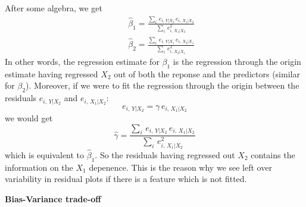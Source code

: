 \documentclass[aps,prl,preprint,superscriptaddress]{revtex4-1}
\begin{document}
After some algebra, we get
%
\begin{eqnarray}
&& {\hat \beta}_1 = \frac{ \sum_i\, e_{i, \, Y \vert X_{2}}\, e_{i, \, X_{1} \vert X_{2}}  } 
			 { \sum_i\, e_{i, \, X_{1} \vert X_{2}}^2 } \nonumber\\
%
&& {\hat \beta}_2 = \frac{ \sum_i\, e_{i, \, Y \vert X_{1}}\, e_{i, \, X_{2} \vert X_{1}}  } 
			 { \sum_i\, e_{i, \, X_{2} \vert X_{1}}^2 } 
\end{eqnarray}
%
In other words, the regression estimate for $\beta_1$ is the regression through the origin estimate having regressed
$X_2$ out of both the reponse and the predictors (similar for $\beta_2$).  
Moreover, if we were to fit the regression through the origin between the residuals $e_{i, \, Y \vert X_2}$
and $e_{i, \, X_1 \vert X_2}$:
%
\begin{equation}
e_{i, \, Y \vert X_2} = \gamma\, e_{i, \, X_1 \vert X_2}
\end{equation}
%
we would get
%
\begin{equation}
{\hat \gamma} = \frac{ \sum_i\, e_{i, \, Y \vert X_{2}}\, e_{i, \, X_{1} \vert X_{2}}  } 
                         { \sum_i\, e_{i, \, X_{1} \vert X_{2}}^2 }
\end{equation}
%
which is equivalent to ${\hat \beta}_1$. So the residuals having regressed out $X_2$ contains
the information on the $X_1$ depenence. This is the reason why we see left over variability
in residual plots if there is a feature which is not fitted.

\vspace{0.5cm}

{\bf Bias-Variance trade-off}
\end{document}
